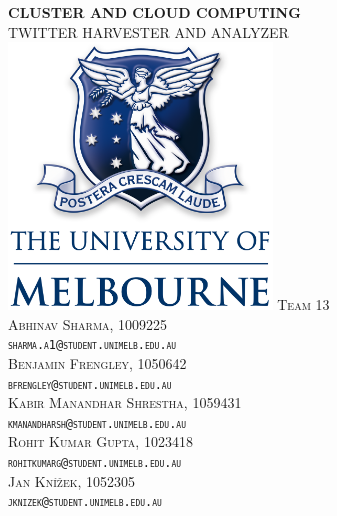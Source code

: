 \begin{titlepage}


\center %
 
\vfill
\textsc{\large\textbf{CLUSTER AND CLOUD COMPUTING} \\[1cm]\LARGE{TWITTER HARVESTER AND ANALYZER}}
\vfill
\includegraphics[width=7cm]{images/unimelblogo.png}
\vfill
\textsc{\LARGE{Team 13}}
\vspace{5mm}\\
\textsc{ Abhinav Sharma, 1009225\\
    \texttt{sharma.a1@student.unimelb.edu.au} }\\
    \vspace{5mm}
\textsc{ Benjamin Frengley, 1050642\\
    \texttt{bfrengley@student.unimelb.edu.au}}\\
    \vspace{5mm}
\textsc{ Kabir Manandhar Shrestha, 1059431\\
    \texttt{kmanandharsh@student.unimelb.edu.au}}\\
    \vspace{5mm}
\textsc{ Rohit Kumar Gupta, 1023418\\
    \texttt{rohitkumarg@student.unimelb.edu.au}}\\
    \vspace{5mm}
\textsc{ Jan Knížek, 1052305\\
    \texttt{jknizek@student.unimelb.edu.au}}

\end{titlepage}